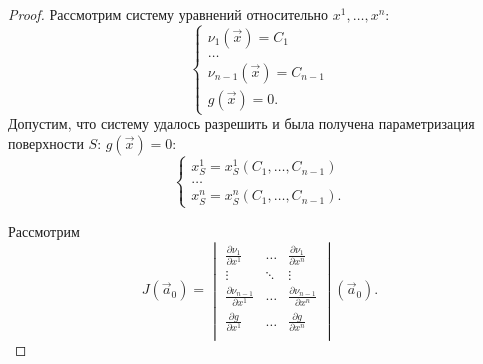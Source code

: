 \begin{proof}
    Рассмотрим систему уравнений относительно $x^1, \dots, x^n$:
    \begin{equation}
        \begin{cases}
            \nu_1 \left( \vec{x} \right) = C_1             \\
            \dots                                                     \\
            \nu_{n - 1} \left( \vec{x} \right) = C_{n - 1} \\
            g \left( \vec{x} \right) = 0.
        \end{cases}
        \label{part_eq_5}
    \end{equation}
    Допустим, что систему удалось разрешить и была получена параметризация поверхности $S$: $g \left( \vec{x} \right) = 0$:
    \begin{equation*}
        \begin{cases}
            x^1_S = x^1_S \left( C_1, \dots, C_{n - 1} \right) \\
            \dots                                              \\
            x^n_S = x^n_S \left( C_1, \dots, C_{n - 1} \right).
        \end{cases}
    \end{equation*}

    Рассмотрим
    \begin{equation*}
        J \left( \vec{a}_0 \right) =
        \begin{vmatrix}
            \displaystyle \frac{\partial \nu_1}{\partial x^1} & \dots & \displaystyle \frac{\partial \nu_1}{\partial x^n}             \\
            \vdots & \ddots & \vdots                                                                                          \\
            \displaystyle \frac{\partial \nu_{n - 1}}{\partial x^1} & \dots & \displaystyle \frac{\partial \nu_{n - 1}}{\partial x^n} \\
            \displaystyle \frac{\partial g}{\partial x^1} & \dots & \displaystyle \frac{\partial g}{\partial x^n}                     \\
        \end{vmatrix}  \left( \vec{a}_0 \right).
    \end{equation*}
    

\end{proof}
